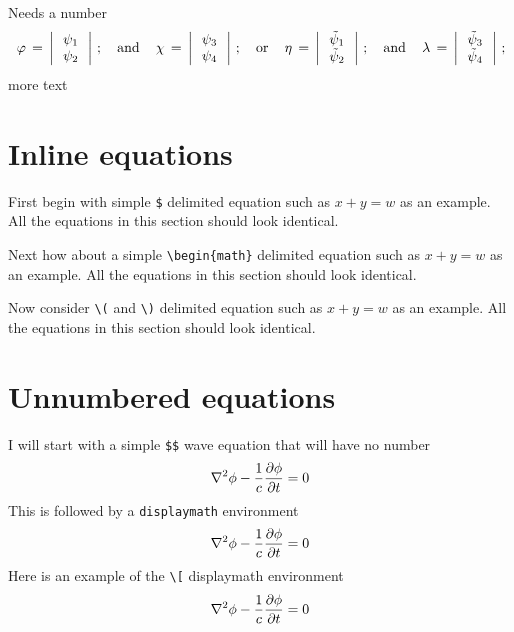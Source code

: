 \documentclass{article}
\begin{document}
Needs a number
\begin{equation}\label{ab3}
\,\varphi\,=\,\left|\,
\begin{array}{c}
\psi_1 \\
\psi_2
\end{array}\,\right|\,; \quad {\rm and} \quad
\,\chi\,=\,\left|\,
\begin{array}{c}
\psi_3 \\
\psi_4
\end{array}\,\right|\,; \quad {\rm or} \quad
\,\eta\,=\,\left|\,
\begin{array}{c}
\tilde{\psi}_1 \\
\tilde{\psi}_2
\end{array}\,\right|\,; \quad {\rm and} \quad
\,\lambda\,=\,\left|\,
\begin{array}{c}
\tilde{\psi}_3 \\
\tilde{\psi}_4
\end{array}\,\right|\,;
\end{equation}
more text

\section{Inline equations}

First begin with simple \verb#$# delimited equation such as
$x+y=w$ as an example.  All the equations in this section should
look identical.

Next how about a simple \verb#\begin{math}# delimited equation such as
\begin{math}x+y=w\end{math} as an example.  All the equations in this section should
look identical.

Now consider \verb#\(# and \verb#\)# delimited equation such as
\(x+y=w\) as an example.  All the equations in this section should
look identical.

\section{Unnumbered equations}

I will start with a simple \verb#$$# wave equation
that will have no number
$$
\nabla^2 \phi -{1\over c} {\partial \phi\over \partial t}  = 0
$$
This is followed by a \verb#displaymath# environment
\begin{displaymath}
\nabla^2 \phi -{1\over c} {\partial \phi\over \partial t}  = 0
\end{displaymath}
Here is an example of the \verb#\[# displaymath environment
\[
\nabla^2 \phi -{1\over c} {\partial \phi\over \partial t}  = 0
\]
\end{document}
